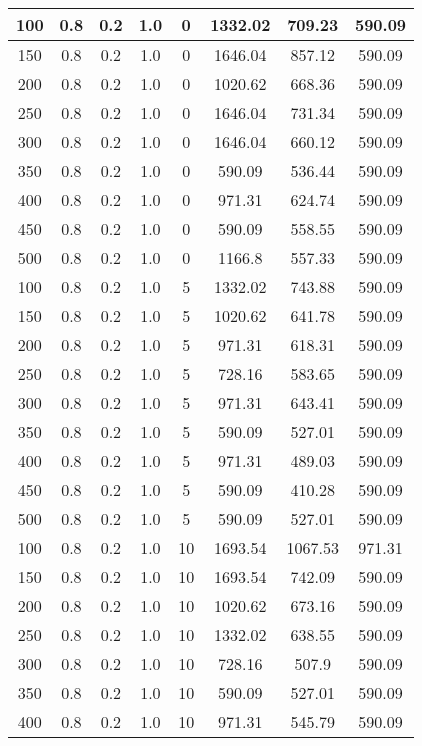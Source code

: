\documentclass[a4paper, 12pt]{extreport}
\begin{document}
\begin{itemize}
\begin{longtable}{|c|c|c|c|c|c|c|c|}
			100 & 0.8 & 0.2 & 1.0 & 0 & 1332.02 & 709.23 & 590.09 \\\hline
			150 & 0.8 & 0.2 & 1.0 & 0 & 1646.04 & 857.12 & 590.09 \\\hline
			200 & 0.8 & 0.2 & 1.0 & 0 & 1020.62 & 668.36 & 590.09 \\\hline
			250 & 0.8 & 0.2 & 1.0 & 0 & 1646.04 & 731.34 & 590.09 \\\hline
			300 & 0.8 & 0.2 & 1.0 & 0 & 1646.04 & 660.12 & 590.09 \\\hline
			350 & 0.8 & 0.2 & 1.0 & 0 & 590.09 & 536.44 & 590.09 \\\hline
			400 & 0.8 & 0.2 & 1.0 & 0 & 971.31 & 624.74 & 590.09 \\\hline
			450 & 0.8 & 0.2 & 1.0 & 0 & 590.09 & 558.55 & 590.09 \\\hline
			500 & 0.8 & 0.2 & 1.0 & 0 & 1166.8 & 557.33 & 590.09 \\\hline
			100 & 0.8 & 0.2 & 1.0 & 5 & 1332.02 & 743.88 & 590.09 \\\hline
			150 & 0.8 & 0.2 & 1.0 & 5 & 1020.62 & 641.78 & 590.09 \\\hline
			200 & 0.8 & 0.2 & 1.0 & 5 & 971.31 & 618.31 & 590.09 \\\hline
			250 & 0.8 & 0.2 & 1.0 & 5 & 728.16 & 583.65 & 590.09 \\\hline
			300 & 0.8 & 0.2 & 1.0 & 5 & 971.31 & 643.41 & 590.09 \\\hline
			350 & 0.8 & 0.2 & 1.0 & 5 & 590.09 & 527.01 & 590.09 \\\hline
			400 & 0.8 & 0.2 & 1.0 & 5 & 971.31 & 489.03 & 590.09 \\\hline
			450 & 0.8 & 0.2 & 1.0 & 5 & 590.09 & 410.28 & 590.09 \\\hline
			500 & 0.8 & 0.2 & 1.0 & 5 & 590.09 & 527.01 & 590.09 \\\hline
			100 & 0.8 & 0.2 & 1.0 & 10 & 1693.54 & 1067.53 & 971.31 \\\hline
			150 & 0.8 & 0.2 & 1.0 & 10 & 1693.54 & 742.09 & 590.09 \\\hline
			200 & 0.8 & 0.2 & 1.0 & 10 & 1020.62 & 673.16 & 590.09 \\\hline
			250 & 0.8 & 0.2 & 1.0 & 10 & 1332.02 & 638.55 & 590.09 \\\hline
			300 & 0.8 & 0.2 & 1.0 & 10 & 728.16 & 507.9 & 590.09 \\\hline
			350 & 0.8 & 0.2 & 1.0 & 10 & 590.09 & 527.01 & 590.09 \\\hline
			400 & 0.8 & 0.2 & 1.0 & 10 & 971.31 & 545.79 & 590.09 \\\hline

\end{longtable}
\end{itemize}
\end{document}
